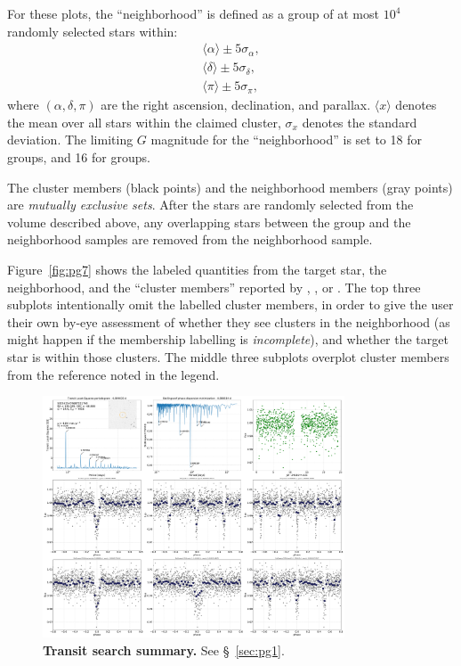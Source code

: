 \documentclass[12pt,twocolumn,tighten]{aastex62}
\begin{document}
For these plots, the ``neighborhood'' is defined as a group of at
most $10^4$ randomly selected stars within:
\begin{align}
\langle \alpha \rangle \pm 5\sigma_\alpha, \\
\langle \delta \rangle \pm 5\sigma_\delta, \\
\langle \pi \rangle \pm 5\sigma_\pi,
\end{align}
where $(\alpha, \delta, \pi)$ are the right ascension,
declination, and parallax.
$\langle x \rangle$ denotes the mean over all stars within
the claimed cluster, $\sigma_x$ denotes the standard deviation.
The limiting $G$ magnitude for the ``neighborhood'' is set
to 18 for \citet{cantat-gaudin_gaia_2018} groups, and 16
for \cite{Kharchenko_et_al_2013} groups.

The cluster members (black points) and the neighborhood members (gray
points) are {\it mutually exclusive sets}. After the stars are
randomly selected from the volume described above, any overlapping
stars between the group and the neighborhood samples are removed from
the neighborhood sample.

Figure~\ref{fig:pg7} shows the labeled quantities from the target
star, the neighborhood, and the ``cluster members'' reported by
\citet{cantat-gaudin_gaia_2018}, \cite{kounkel_untangling_2019}, or
\citet{Kharchenko_et_al_2013}.  The top three subplots intentionally
omit the labelled cluster members, in order to give the user their own
by-eye assessment of whether they see clusters in the neighborhood (as
might happen if the membership labelling is {\it incomplete}),
and whether the target star is within those clusters.
The middle three subplots overplot cluster members from the reference
noted in the legend.

\begin{figure}[!h]
	\begin{center}
		\leavevmode
		\includegraphics[width=0.8\textwidth]{pg_0001.pdf}
	\end{center}
	\vspace{-0.5cm}
	\caption{
    {\bf Transit search summary.} See \S~\ref{sec:pg1}.
		\label{fig:pg1}
	}
\end{figure}
\end{document}
